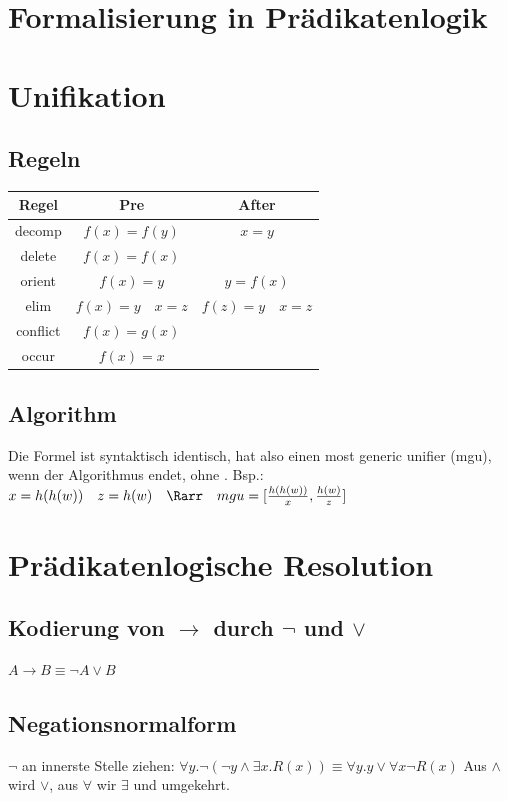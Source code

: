 \documentclass{article}
\begin{document}
	\section{Formalisierung in Prädikatenlogik}
	\section{Unifikation}
		\subsection{Regeln} %
			\begin{center}
				\begin{tabular} {c|c|c}
					Regel & Pre & After \\
					\hline
					decomp & $f(x)=f(y)$ & $x=y$ \\
					\hline
					delete & $f(x) = f(x)$ & \\
					\hline
					orient & $f(x) = y$ & $y = f(x)$ \\
					\hline
					elim & $f(x) = y \quad x = z$ & $f(z)= y \quad x = z$ \\
					\hline
					conflict & $f(x) = g(x)$ & \bot \\
					\hline
					occur & $f(x) = x $ & \bot
				\end{tabular}
			\end{center}
		\subsection{Algorithm}
			Die Formel ist syntaktisch identisch, hat also einen most generic unifier (mgu), wenn der Algorithmus endet, ohne \bot. \newline
			Bsp.: $x=h(h(w)) \quad z = h(w) \quad \Rarr \quad mgu = [\frac{h(h(w))}{x}, \frac{h(w)}{z}]$
	\section{Prädikatenlogische Resolution}
		\subsection{Kodierung von $\to$ durch $\lnot$ und $\lor$}
			$A\to B \equiv \lnot A \lor B$
		\subsection{Negationsnormalform}
			$\lnot$ an innerste Stelle ziehen: \newline
			$\forall y.\lnot(\lnot y \land \exists x. R(x))\equiv \forall y.y \lor \forall x \lnot R(x)$ \newline
			Aus $\land$ wird $\lor$, aus $\forall$ wir $\exists$ und umgekehrt. 
\end{document}
